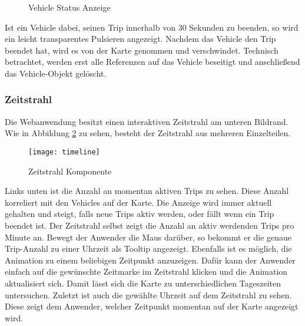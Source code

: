     \begin{figure}[htbp]
      \centering
      \hfill
      \caption{Vehicle Status Anzeige}
      \label{fig:vehicle_states}
    \end{figure}
    
    Ist ein Vehicle dabei, seinen Trip innerhalb von 30 Sekunden zu beenden, so wird ein leicht transparentes Pulsieren angezeigt. Nachdem das Vehicle den Trip beendet hat, wird es von der Karte genommen und verschwindet. Technisch betrachtet, werden erst alle Referenzen auf das Vehicle beseitigt und anschließend das Vehicle-Objekt gelöscht.
    

  \subsubsection*{Zeitstrahl}
  \label{ssub:zeitstrahl}
    Die Webanwendung besitzt einen interaktiven Zeitstrahl am unteren Bildrand. Wie in Abbildung \ref{fig:timeline} zu sehen, besteht der Zeitstrahl aus mehreren Einzelteilen. 

    \begin{figure}[htbp]
      \begin{center}
        \texttt{[image: timeline]}
        \caption{Zeitstrahl Komponente}
        \label{fig:timeline}
      \end{center}
    \end{figure}

    Links unten ist die Anzahl an momentan aktiven Trips zu sehen. Diese Anzahl korreliert mit den Vehicles auf der Karte. Die Anzeige wird immer aktuell gehalten und steigt, falls neue Trips aktiv werden, oder fällt wenn ein Trip beendet ist. Der Zeitstrahl selbst zeigt die Anzahl an aktiv werdenden Trips pro Minute an. Bewegt der Anwender die Maus darüber, so bekommt er die genaue Trip-Anzahl zu einer Uhrzeit als Tooltip angezeigt. Ebenfalls ist es möglich, die Animation zu einem beliebigen Zeitpunkt anzuzeigen. Dafür kann der Anwender einfach auf die gewünschte Zeitmarke im Zeitstrahl klicken und die Animation aktualisiert sich. Damit lässt sich die Karte zu unterschiedlichen Tageszeiten untersuchen. Zuletzt ist auch die gewählte Uhrzeit auf dem Zeitstrahl zu sehen. Diese zeigt dem Anwender, welcher Zeitpunkt momentan auf der Karte angezeigt wird.
    
